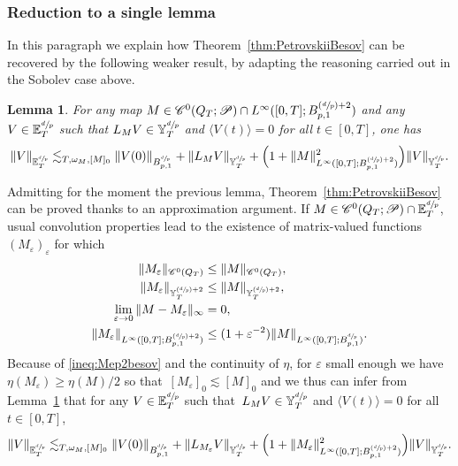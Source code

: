 \documentclass[JEP,XML,SOM,Unicode,published]{cedram}
\newcommand{\Psfrac}[2]{(\sfrac{#1}{#2})}
\newtheorem{lem}[prop]{Lemma}
\theoremstyle{definition}
\let\ep\varepsilon
\begin{document}
\subsubsection{Reduction to a single lemma}\label{subsec:redlipbesov}
In this paragraph we explain how Theorem~\ref{thm:PetrovskiiBesov} can be recovered by the following weaker result, by adapting the reasoning carried out in the Sobolev case above.
\begin{lem}\label{lem:goalL2:weakbesov}
For any map $M\in \mathscr{C}^{0}(Q_T;\mathscr{P})\cap L^\infty ([0,T];B^{\Psfrac dp+2}_{p,1}) $ and any $V\in {\mathbb E}_T^{\sfrac dp}$ such that $L_M V\in {\mathbb Y}_T^{\sfrac dp}$ and $\langle V(t)\rangle = 0$ for all $t\in[0,T]$, one has\vspace*{-3pt}
\[
\|V\|_{ {\mathbb E}_T^{\sfrac dp}} \lesssim_{T,\omega_M,[M]_0} \|V(0)\|_{B^{\sfrac dp}_{p,1}} + \| L_M V \|_{{\mathbb Y}_T^{\sfrac dp} } + \Bigl(1+\|M\|^2_{ L^\infty ([0,T];B^{\Psfrac dp+2}_{p,1}) }\Bigr) \|V\|_ {{\mathbb Y}_T^{\sfrac dp}}.
\]
\end{lem}
Admitting for the moment the previous lemma, Theorem~\ref{thm:PetrovskiiBesov}
can be proved thanks to an approximation argument. If $M\in\mathscr{C}^{0}(Q_T;\mathscr{P})\cap {\mathbb E}^{\sfrac dp}_T $, usual convolution properties lead to the existence of matrix-valued functions $(M_\ep)_\ep$ for which\vspace*{-3pt}
\begin{align}
\label{ineq:Mep1besov}\|M_\ep\|_{\mathscr{C}^{0}(Q_T)}&\leq \|M\|_{\mathscr{C}^{0}(Q_T)},\\
\label{ineq:Mep11besov}\|M_\ep\|_{{\mathbb Y}_T^{\Psfrac dp+2}}&\leq \|M\|_{{\mathbb Y}_T^{\Psfrac dp+2}},\\
\label{ineq:Mep2besov}\lim_{\ep \to 0}\|M-M_\ep\|_\infty &= 0,\\
\label{ineq:Mep3besov}\|M_\ep\|_{ L^\infty ([0,T];B^{\Psfrac dp+2}_{p,1}) }&\leq (1+\ep^{-2})\|M\|_{ L^\infty ([0,T];B^{\sfrac dp}_{p,1}) }.
\end{align}
Because of \eqref{ineq:Mep2besov} and the continuity of $\eta$, for $\ep$ small enough we have $\eta(M_\ep)\geq \eta(M)/2$ so that~$[M_\ep]_0\lesssim[M]_0$ and we thus can infer from Lemma~\ref{lem:goalL2:weakbesov} that for any $V\in {\mathbb E}^{\sfrac dp}_T$ such that~$L_M V\in {\mathbb Y}^{\sfrac dp}_T$ and $\langle V(t)\rangle = 0$ for all $t\in[0,T]$,\vspace*{-3pt}
\[
\|V\|_{{\mathbb E}^{\sfrac dp}_T} \lesssim_{T,\omega_M,[M]_0} \|V(0)\|_{B^{\sfrac dp}_{p,1}} + \| L_{M_\ep} V \|_{{\mathbb Y}^{\sfrac dp}_T } + \Bigl(1+\|M_\ep\|^2_{ L^\infty ([0,T];B^{\Psfrac dp+2}_{p,1}) }\Bigr) \|V\|_ {{\mathbb Y}^{\sfrac dp}_T}.
\]
\end{document}
